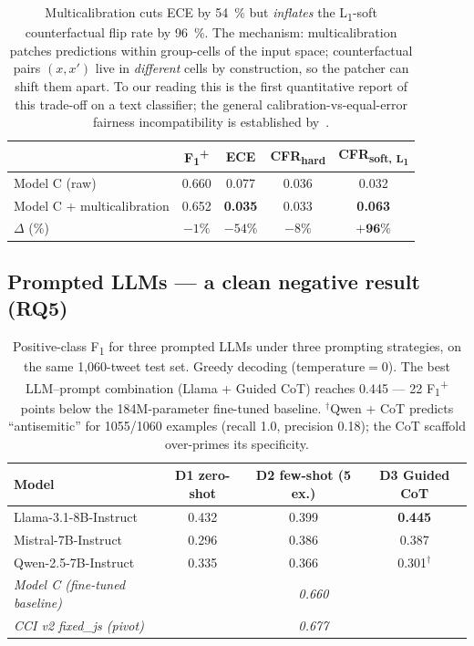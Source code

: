 \documentclass[10pt,a4paper]{article}
\begin{document}
\begin{table}[h]
\centering
\small
\begin{tabular}{l c c c c}
\toprule
& F\textsubscript{1}\textsuperscript{+} & ECE & CFR\textsubscript{hard} & CFR\textsubscript{soft, L\textsubscript{1}} \\
\midrule
Model C (raw)                     & 0.660 & 0.077 & 0.036 & 0.032 \\
Model C + multicalibration        & 0.652 & \textbf{0.035} & 0.033 & \textbf{0.063} \\
$\Delta$ (\%)                      & $-1\%$ & $-54\%$ & $-8\%$ & $\mathbf{+96\%}$ \\
\bottomrule
\end{tabular}
\caption{Multicalibration cuts ECE by 54~\% but \emph{inflates}
the L\textsubscript{1}-soft counterfactual flip rate by 96~\%. The mechanism:
multicalibration patches predictions within group-cells of the input space;
counterfactual pairs $(x, x')$ live in \emph{different} cells by construction,
so the patcher can shift them apart. To our reading this is the first
quantitative report of this trade-off on a text classifier; the general
calibration-vs-equal-error fairness incompatibility is established
by~\citet{pleiss2017fairness}.}
\label{tab:tension}
\end{table}

\subsection{Prompted LLMs --- a clean negative result (RQ5)}
\label{sec:results-llm}

\begin{table}[h]
\centering
\small
\begin{tabular}{l c c c}
\toprule
Model & D1 zero-shot & D2 few-shot (5 ex.) & D3 Guided CoT \\
\midrule
Llama-3.1-8B-Instruct  & 0.432 & 0.399 & \textbf{0.445} \\
Mistral-7B-Instruct    & 0.296 & 0.386 & 0.387 \\
Qwen-2.5-7B-Instruct   & 0.335 & 0.366 & 0.301$^{\dagger}$ \\
\midrule
\textit{Model C (fine-tuned baseline)} & \multicolumn{3}{c}{\textit{0.660}} \\
\textit{CCI v2 fixed\_js (pivot)}      & \multicolumn{3}{c}{\textit{0.677}} \\
\bottomrule
\end{tabular}
\caption{Positive-class F\textsubscript{1} for three prompted LLMs under three
prompting strategies, on the same 1{,}060-tweet test set. Greedy decoding
(temperature$=0$). The best LLM--prompt combination (Llama + Guided CoT)
reaches 0.445 --- 22 F\textsubscript{1}\textsuperscript{+} points below
the 184M-parameter fine-tuned baseline. $^{\dagger}$Qwen + CoT predicts
``antisemitic'' for 1055/1060 examples (recall 1.0, precision 0.18); the
CoT scaffold over-primes its specificity.}
\label{tab:llm}
\end{table}
\end{document}

